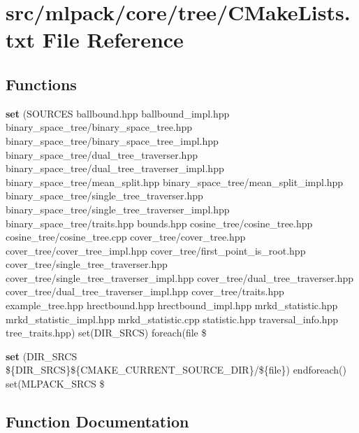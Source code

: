\section{src/mlpack/core/tree/\-C\-Make\-Lists.txt File Reference}
\label{core_2tree_2CMakeLists_8txt}
\subsection*{Functions}
\begin{DoxyCompactItemize}
\item 
{\bf set} (S\-O\-U\-R\-C\-E\-S ballbound.\-hpp ballbound\-\_\-impl.\-hpp binary\-\_\-space\-\_\-tree/binary\-\_\-space\-\_\-tree.\-hpp binary\-\_\-space\-\_\-tree/binary\-\_\-space\-\_\-tree\-\_\-impl.\-hpp binary\-\_\-space\-\_\-tree/dual\-\_\-tree\-\_\-traverser.\-hpp binary\-\_\-space\-\_\-tree/dual\-\_\-tree\-\_\-traverser\-\_\-impl.\-hpp binary\-\_\-space\-\_\-tree/mean\-\_\-split.\-hpp binary\-\_\-space\-\_\-tree/mean\-\_\-split\-\_\-impl.\-hpp binary\-\_\-space\-\_\-tree/single\-\_\-tree\-\_\-traverser.\-hpp binary\-\_\-space\-\_\-tree/single\-\_\-tree\-\_\-traverser\-\_\-impl.\-hpp binary\-\_\-space\-\_\-tree/traits.\-hpp bounds.\-hpp cosine\-\_\-tree/cosine\-\_\-tree.\-hpp cosine\-\_\-tree/cosine\-\_\-tree.\-cpp cover\-\_\-tree/cover\-\_\-tree.\-hpp cover\-\_\-tree/cover\-\_\-tree\-\_\-impl.\-hpp cover\-\_\-tree/first\-\_\-point\-\_\-is\-\_\-root.\-hpp cover\-\_\-tree/single\-\_\-tree\-\_\-traverser.\-hpp cover\-\_\-tree/single\-\_\-tree\-\_\-traverser\-\_\-impl.\-hpp cover\-\_\-tree/dual\-\_\-tree\-\_\-traverser.\-hpp cover\-\_\-tree/dual\-\_\-tree\-\_\-traverser\-\_\-impl.\-hpp cover\-\_\-tree/traits.\-hpp example\-\_\-tree.\-hpp hrectbound.\-hpp hrectbound\-\_\-impl.\-hpp mrkd\-\_\-statistic.\-hpp mrkd\-\_\-statistic\-\_\-impl.\-hpp mrkd\-\_\-statistic.\-cpp statistic.\-hpp traversal\-\_\-info.\-hpp tree\-\_\-traits.\-hpp) set(D\-I\-R\-\_\-\-S\-R\-C\-S) foreach(file \$
\item 
{\bf set} (D\-I\-R\-\_\-\-S\-R\-C\-S \$\{D\-I\-R\-\_\-\-S\-R\-C\-S\}\$\{C\-M\-A\-K\-E\-\_\-\-C\-U\-R\-R\-E\-N\-T\-\_\-\-S\-O\-U\-R\-C\-E\-\_\-\-D\-I\-R\}/\$\{file\}) endforeach() set(M\-L\-P\-A\-C\-K\-\_\-\-S\-R\-C\-S \$
\end{DoxyCompactItemize}


\subsection{Function Documentation}
